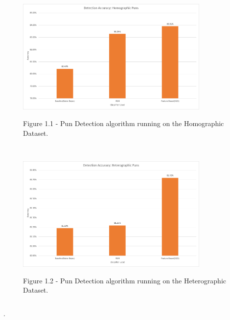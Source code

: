 \documentclass[final]{beamer}
\newlength{\onecolwid}
\newlength{\twocolwid}
\begin{document}
\begin{frame}[t]
\begin{columns}[t]
\begin{column}{\twocolwid}
\begin{columns}[t,totalwidth=\twocolwid]
\begin{column}{\onecolwid}
					\begin{figure}
						\includegraphics[width=0.85\textwidth]{HomographicDetection.png}\\
						\caption{Figure 1.1 - Pun Detection algorithm running on the Homographic Dataset.}
					\end{figure}
					\\
					\vspace{20mm}
					\begin{figure}
						\includegraphics[width=0.85\textwidth]{HeterographicDetection.png}\\
						\caption{Figure 1.2 - Pun Detection algorithm running on the Heterographic Dataset.}
					\end{figure}
				\end{column}
			\end{columns}
			\begin{block}
				{.}
			\end{block}

\end{column}
\end{columns}
\end{frame}
\end{document}
